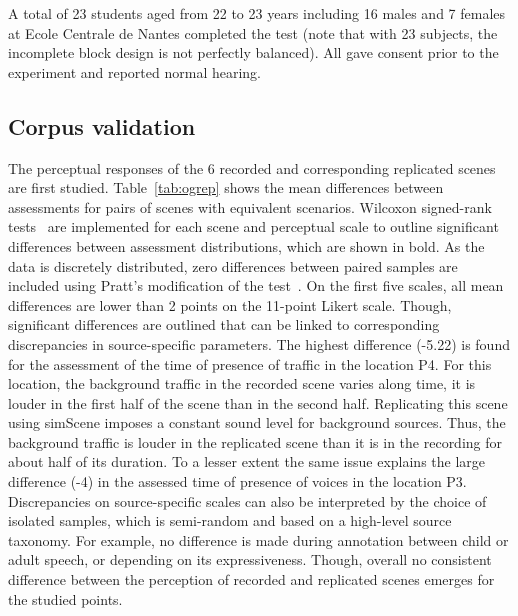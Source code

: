 \documentclass[twocolumn]{article}
\begin{document}
A total of 23 students aged from 22 to 23 years including 16 males and 7 females at Ecole Centrale de Nantes completed the test (note that with 23 subjects, the incomplete block design is not perfectly balanced). All gave consent prior to the experiment and reported normal hearing.

\subsection{Corpus validation}
\label{sec:data_val}

The perceptual responses of the 6 recorded and corresponding replicated scenes are first studied. Table~\ref{tab:ogrep} shows the mean differences between assessments for pairs of scenes with equivalent scenarios. Wilcoxon signed-rank tests~\cite{wilcoxon1945} are implemented for each scene and perceptual scale to outline significant differences between assessment distributions, which are shown in bold. As the data is discretely distributed, zero differences between paired samples are included using Pratt's modification of the test~\cite{pratt1959}. On the first five scales, all mean differences are lower than 2 points on the 11-point Likert scale. Though, significant differences are outlined that can be linked to corresponding discrepancies in source-specific parameters. The highest difference (-5.22) is found for the assessment of the time of presence of traffic in the location P4. For this location, the background traffic in the recorded scene varies along time, it is louder in the first half of the scene than in the second half. Replicating this scene using simScene imposes a constant sound level for background sources. Thus, the background traffic is louder in the replicated scene than it is in the recording for about half of its duration. To a lesser extent the same issue explains the large difference (-4) in the assessed time of presence of voices in the location P3. Discrepancies on source-specific scales can also be interpreted by the choice of isolated samples, which is semi-random and based on a high-level source taxonomy. For example, no difference is made during annotation between child or adult speech, or depending on its expressiveness. Though, overall no consistent difference between the perception of recorded and replicated scenes emerges for the studied points.
\end{document}
